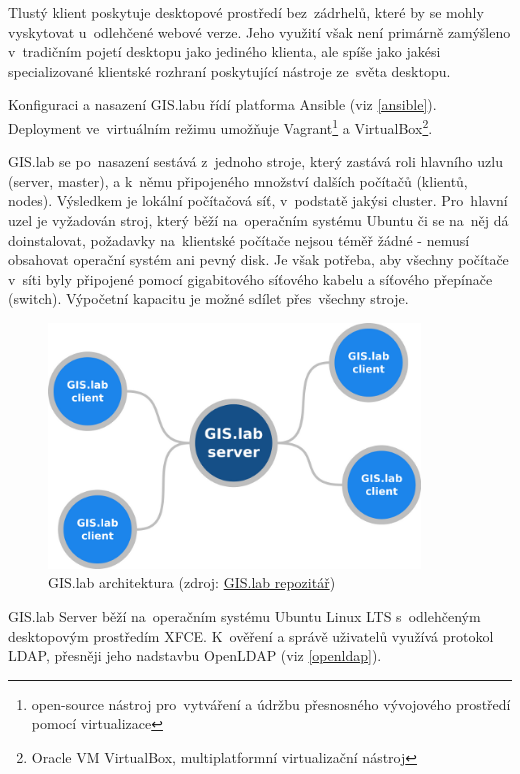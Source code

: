 Tlustý klient poskytuje desktopové prostředí bez~zádrhelů, které by se
mohly vyskytovat u~odlehčené webové verze. Jeho využití však není primárně
zamýšleno v~tradičním pojetí desktopu jako jediného klienta, ale spíše
jako jakési specializované klientské rozhraní poskytující nástroje ze~světa desktopu.

Konfiguraci a nasazení GIS.labu řídí platforma Ansible (viz
\ref{ansible}). Deployment ve~virtuálním režimu umožňuje
Vagrant\footnote{open-source nástroj pro~vytváření a údržbu
  přesnosného vývojového prostředí pomocí virtua\-lizace} a
VirtualBox\footnote{Oracle VM VirtualBox, multiplatformní
  virtualizační nástroj}.

GIS.lab se po~nasazení sestává z~jednoho stroje, který zastává roli
hlavního uzlu (server, master), a k~němu připojeného množství dalších počítačů
(klientů, nodes). Výsledkem je lokální počítačová síť, v~podstatě jakýsi cluster.
Pro~hlavní uzel je vyžadován stroj, který běží na~operačním systému
Ubuntu či se na~něj dá doinstalovat, požadavky na~klientské počítače nejsou téměř žádné - nemusí
obsahovat ope\-rační systém ani pevný disk. Je však potřeba, aby všechny
počítače v~síti byly připojené pomocí gigabitového síťového kabelu a
síťového přepínače (switch). Výpočetní kapacitu je možné sdílet přes~všechny stroje. \cite{gislab-doc}

\begin{figure}[H] \centering
    \includegraphics[width=280pt]{./pictures/gislab-architecture.png}
    \caption[GIS.lab architektura]{GIS.lab architektura (zdroj:
	\href{https://github.com/gislab-npo/gislab-doc/blob/master/img/general/gislab-architecture.png}{GIS.lab repozitář})}
	\label{fig:gislab-architecture}
\end{figure}

GIS.lab Server běží na~operačním systému Ubuntu Linux LTS s~odlehčeným
desktopovým prostředím XFCE. \cite{gislab-main} K~ověření a správě uživatelů využívá
protokol LDAP, přesněji jeho nadstavbu OpenLDAP (viz \ref{openldap}).

